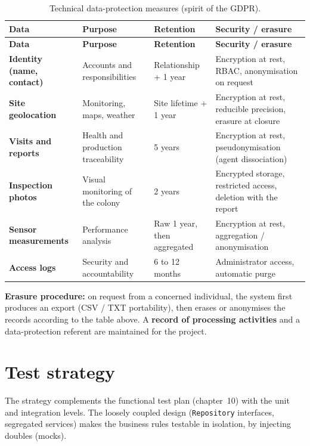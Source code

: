 {\small
\begin{xltabular}{\textwidth}{>{\bfseries}p{3.1cm} p{3.3cm} p{2.7cm} X}
\caption{Technical data-protection measures (spirit of the GDPR).}
\label{tab:rgpd}\\
\toprule
\textbf{Data} & \textbf{Purpose} & \textbf{Retention} & \textbf{Security / erasure} \\
\midrule
\endfirsthead
\toprule
\textbf{Data} & \textbf{Purpose} & \textbf{Retention} & \textbf{Security / erasure} \\
\midrule
\endhead
Identity (name, contact) & Accounts and responsibilities & Relationship + 1 year & Encryption at rest, RBAC, anonymisation on request \\
Site geolocation & Monitoring, maps, weather & Site lifetime + 1 year & Encryption at rest, reducible precision, erasure at closure \\
Visits and reports & Health and production traceability & 5 years & Encryption at rest, pseudonymisation (agent dissociation) \\
Inspection photos & Visual monitoring of the colony & 2 years & Encrypted storage, restricted access, deletion with the report \\
Sensor measurements & Performance analysis & Raw 1 year, then aggregated & Encryption at rest, aggregation / anonymisation \\
Access logs & Security and accountability & 6 to 12 months & Administrator access, automatic purge \\
\bottomrule
\end{xltabular}}

\begin{encadre}
\textbf{Erasure procedure:} on request from a concerned individual, the system
first produces an export (CSV / TXT portability), then erases or anonymises the
records according to the table above. A \textbf{record of processing activities}
and a data-protection referent are maintained for the project.
\end{encadre}

\section{Test strategy}
The strategy complements the functional test plan (chapter~10) with the unit and
integration levels. The loosely coupled design (\texttt{Repository} interfaces,
segregated services) makes the business rules testable in isolation, by
injecting doubles (mocks).

